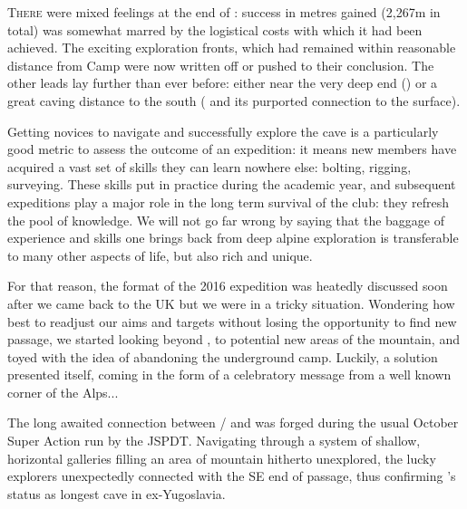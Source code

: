 \newpage
\thispagestyle{endchapter}

\begin{tcolorbox}
\vspace{80pt}
	\lettrine{T}{here} were mixed feelings at the end of : success in metres gained (2,267m in total) was somewhat marred by the logistical costs with which it had been achieved. The exciting exploration fronts, which had remained within reasonable distance from Camp were now written off or pushed to their conclusion. The other leads lay further than ever before: either near the very deep end () or a great caving distance to the south ( and its purported connection to the surface).

	Getting novices to navigate and successfully explore the cave is a particularly good metric to assess the outcome of an expedition: it means new members have acquired a vast set of skills they can learn nowhere else: bolting, rigging, surveying. These skills put in practice during the academic year, and subsequent expeditions play a major role in the long term survival of the club: they refresh the pool of knowledge. We will not go far wrong by saying that the baggage of experience and skills one brings back from deep alpine exploration is transferable to many other aspects of life, but also rich and unique.

	For that reason, the format of the 2016 expedition was heatedly discussed soon after we came back to the UK but we were in a tricky situation. Wondering how best to readjust our aims and targets without losing the opportunity to find new passage, we started looking beyond , to potential new areas of the mountain, and toyed with the idea of abandoning the underground camp. Luckily, a solution presented itself, coming in the form of a celebratory message from a well known corner of the Alps...

	The long awaited connection between / and  was forged during the usual October Super Action run by the JSPDT. Navigating through a system of shallow, horizontal galleries filling an area of mountain hitherto unexplored, the lucky explorers unexpectedly connected with the SE end of  passage, thus confirming 's status as longest cave in ex-Yugoslavia.

	
\end{tcolorbox}
